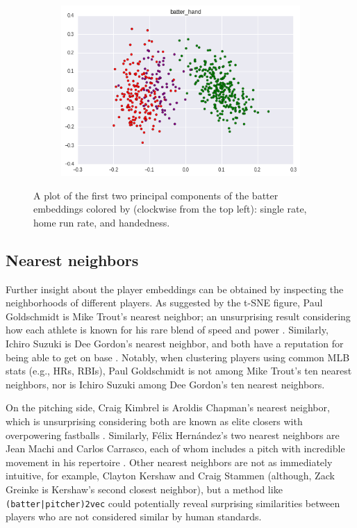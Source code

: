 \documentclass{article}
\begin{document}
\begin{figure}
    \begin{subfigure}{0.5\linewidth}
    \centering
    \includegraphics[width=1\linewidth]{batter_hand.png}
    \caption{}
    \end{subfigure}
\caption{A plot of the first two principal components of the batter embeddings colored by (clockwise from the top left): single rate, home run rate, and handedness.}
\label{fig:batter_traits}
\end{figure}

\subsection{Nearest neighbors}

Further insight about the player embeddings can be obtained by inspecting the neighborhoods of different players. As suggested by the t-SNE figure, Paul Goldschmidt is Mike Trout's nearest neighbor; an unsurprising result considering how each athlete is known for his rare blend of speed and power \parencite{Kory2015}. Similarly, Ichiro Suzuki is Dee Gordon's nearest neighbor, and both have a reputation for being able to get on base \parencite{Sullivan2015}. Notably, when clustering players using common MLB stats (e.g., HRs, RBIs), Paul Goldschmidt is not among Mike Trout's ten nearest neighbors, nor is Ichiro Suzuki among Dee Gordon's ten nearest neighbors.

On the pitching side, Craig Kimbrel is Aroldis Chapman's nearest neighbor, which is unsurprising considering both are known as elite closers with overpowering fastballs \parencite{Mirsky2016}. Similarly, Félix Hernández's two nearest neighbors are Jean Machi and Carlos Carrasco, each of whom includes a pitch with incredible movement in his repertoire \parencite{Buchanan2015, Romano2015, Berg2016}. Other nearest neighbors are not as immediately intuitive, for example, Clayton Kershaw and Craig Stammen (although, Zack Greinke is Kershaw's second closest neighbor), but a method like \texttt{(batter|pitcher)2vec} could potentially reveal surprising similarities between players who are not considered similar by human standards.
\end{document}
